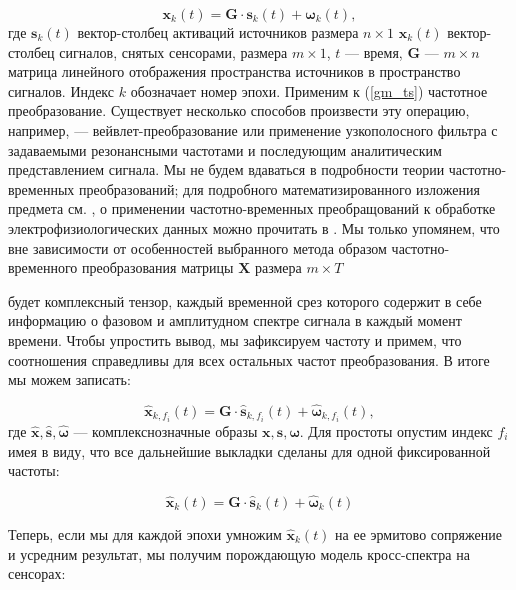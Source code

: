 \begin{equation}
    \mathbf{x}_k(t) = \mathbf{G} \cdot \mathbf{s}_k(t) + \mathbf{\omega}_k(t),
    \label{gm_ts}
\end{equation}
где $\mathbf{s}_k(t)$  вектор-столбец активаций источников размера $n \times 1$
$\mathbf{x}_k(t)$ вектор-столбец сигналов, снятых сенсорами,
размера $m \times 1$, $t$ --- время, $\mathbf{G}$ --- $m \times n$ матрица линейного отображения пространства источников в пространство сигналов.
Индекс $k$ обозначает номер эпохи.
Применим к (\ref{gm_ts}) частотное преобразование. Существует несколько способов произвести
эту операцию, например, --- вейвлет-преобразование или применение узкополосного фильтра
с задаваемыми резонансными частотами и последующим аналитическим представлением сигнала.
Мы не будем вдаваться в подробности теории частотно-временных преобразований;
для подробного математизированного изложения предмета см.
\cite{Oppenheim1998}, о  применении  частотно-временных преобращований к обработке
электрофизиологических данных можно прочитать в \cite{Freeman}.
Мы только упомянем, что вне зависимости от особенностей выбранного
метода образом частотно-временного преобразования матрицы $\mathbf{X}$ размера $m \times T$

будет комплексный тензор, каждый временной срез которого содержит в себе информацию
о фазовом и амплитудном спектре сигнала в каждый момент времени.
Чтобы упростить вывод, мы зафиксируем частоту и примем,
что соотношения справедливы для всех остальных частот преобразования. В итоге мы можем записать:

\begin{equation}
    \hat{\mathbf{x}}_{k,f_i}(t) = \mathbf{G} \cdot \hat{\mathbf{s}}_{k,f_i}(t) + \hat{\mathbf{\omega}}_{k,f_i}(t),
    \label{gm_timefreq}
\end{equation}
где $\hat{\mathbf{x}}, \hat{\mathbf{s}}, \hat{\mathbf{\omega}}$ --- комплекснозначные образы $\mathbf{x}, \mathbf{s}, \mathbf{\omega}$. Для простоты опустим индекс $f_i$ имея в виду, что все дальнейшие выкладки сделаны для одной фиксированной частоты: 

\begin{equation}
    \hat{\mathbf{x}}_k(t) = \mathbf{G} \cdot \hat{\mathbf{s}}_k(t) + \hat{\mathbf{\omega}}_k(t)
    \label{gm_timefreq_no_fi}
\end{equation}

Теперь, если мы для каждой эпохи умножим $\hat{\mathbf{x}}_k(t)$ на ее эрмитово сопряжение  и усредним результат, мы получим порождающую модель кросс-спектра на сенсорах:

